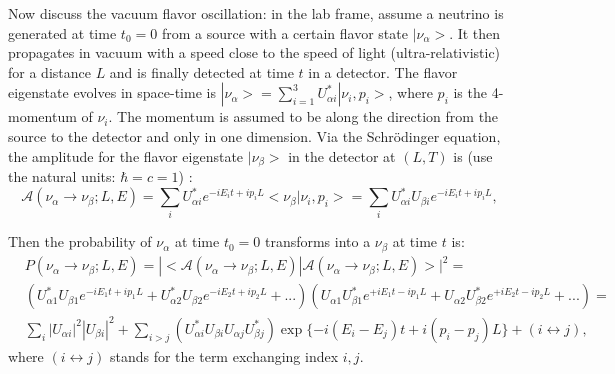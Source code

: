 Now discuss the vacuum flavor oscillation: in the lab frame, assume a neutrino is generated at time $t_0=0$ from a source with a certain flavor state $|\nu_\alpha>$. It then propagates in vacuum with a speed close to the speed of light (ultra-relativistic) for a distance $L$ and is finally detected at time $t$ in a detector. The flavor eigenstate evolves in space-time is $|\nu_\alpha> = \sum_{i=1}^3U^*_{\alpha i}|\nu_i,p_i>$, where $p_i$ is the 4-momentum of $\nu_i$. The momentum is assumed to be along the direction from the source to the detector and only in one dimension. Via the Schr\"{o}dinger equation, the amplitude for the flavor eigenstate $|\nu_\beta>$ in the detector at $(L,T)$ is (use the natural units: $\hbar=c=1$) \cite{aitchison2012gauge}:
\begin{equation}
\mathcal{A}(\nu_\alpha\to\nu_\beta;L,E)=\sum_{i}U^*_{\alpha i}e^{-iE_i t+ip_iL}<\nu_\beta|\nu_i,p_i>=\sum_{i}U^*_{\alpha i}U_{\beta i}e^{-iE_it+ip_iL},
\end{equation}

Then the probability of $\nu_\alpha$ at time $t_0=0$ transforms into a $\nu_\beta$ at time $t$ is:
\begin{equation}\label{oscillationEq1}
 \begin{split}
&P(\nu_\alpha\to\nu_\beta;L,E)=|<\mathcal{A}(\nu_\alpha\to\nu_\beta;L,E)|\mathcal{A}(\nu_\alpha\to\nu_\beta;L,E)>|^2=\\
&(U^*_{\alpha 1}U_{\beta 1}e^{-iE_1t+ip_1L}+U^*_{\alpha 2}U_{\beta 2}e^{-iE_2t+ip_2L}+...)(U_{\alpha 1}U^*_{\beta 1}e^{+iE_1t-ip_1L}+U_{\alpha 2}U^*_{\beta 2}e^{+iE_2t-ip_2L}+...)=\\
&\sum_i |U_{\alpha i}|^2|U_{\beta i}|^2 + \sum_{i>j}(U^*_{\alpha i}U_{\beta i}U_{\alpha j}U^*_{\beta j})\exp\{-i(E_i-E_j)t+i(p_i-p_j)L\}+(i\leftrightarrow j),
\end{split}
\end{equation}
where $(i\leftrightarrow j)$ stands for the term exchanging index $i,j$.

